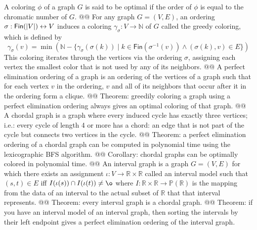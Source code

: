 \documentclass[]{article}
\DeclarePairedDelimiter{\abs}{\lvert}{\rvert}
\newcommand{\textbs}[1]{{\sffamily\fontseries{sbc}\selectfont #1}}
\newcommand{\mbb}[1]{\ensuremath{\mathbb{#1}}}     %
\newcommand{\mrm}[1]{\ensuremath{\mathrm{#1}}}     %
\newcommand{\msf}[1]{\ensuremath{\mathsf{#1}}}     %
\newcommand{\define}[1]{\textbs{#1}}
\begin{document}
\begin{easylist}[itemize]
{  A coloring $\phi$ of a graph $G$ is said to be \define{optimal} if the order
  of $\phi$ is equal to the chromatic number of $G$.
}
@@ {%
  For any graph $G = (V, E)$, an ordering
  $\sigma : \msf{Fin}(\abs{V}) \leftrightarrow V$
  induces a coloring $\gamma_\sigma : V \to \mbb{N}$ of $G$ called the
  \define{greedy coloring}, which is defined by
  \begin{equation*}
  \gamma_\sigma(v) = \min (\mbb{N} - \{ \gamma_\sigma(\sigma(k)) \mid k \in \msf{Fin}(\sigma^{-1}(v)) \wedge (\sigma(k), v) \in E \})
  \end{equation*}
  This coloring iterates through the vertices via the ordering $\sigma$,
  assigning each vertex the smallest color that is not used by any of its
  neighbors.
}
@@ {%
  A \define{perfect elimination ordering} of a graph is an ordering of the
  vertices of a graph such that for each vertex $v$ in the ordering, $v$ and all
  of its neighbors that occur after it in the ordering form a clique.
}
@@ {%
  Theorem: greedily coloring a graph using a perfect elimination ordering always
  gives an optimal coloring of that graph.
}
@@ {%
  A \define{chordal graph} is a graph where every induced cycle has exactly
  three vertices; i.e.: every cycle of length 4 or more has a \define{chord}: an
  edge that is not part of the cycle but connects two vertices in the cycle.
}
@@ {%
  Theorem: a perfect elimination ordering of a chordal graph can be computed in
  polynomial time using the \define{lexicographic BFS} algorithm.
}
@@ Corollary: chordal graphs can be optimally colored in polynomial time.
@@ {%
  An \define{interval graph} is a graph $G = (V, E)$ for which there exists an
  assignment $\iota : V \to \mbb{R} \times \mbb{R}$ called an
  \define{interval model} such that
  $(s, t) \in E$ iff $I(\iota(s)) \cap I(\iota(t)) \neq \o$
  where $I : \mbb{R} \times \mbb{R} \to \mbb{P}(\mbb{R})$
  is the mapping from the data of an interval to the actual subset
  of $\mbb{R}$ that that interval represents.
}
@@ Theorem: every interval graph is a chordal graph.
@@ {%
  Theorem: if you have an interval model of an interval graph, then sorting the
  intervals by their left endpoint gives a perfect elimination ordering of the
  interval graph.
}
\end{easylist}
\end{document}
